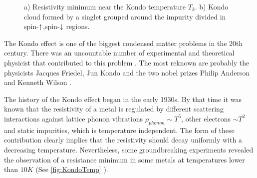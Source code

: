 \begin{figure}[t]
     \centering
    
     \caption{ a) Resistivity minimum near the Kondo temperature $T_k$. b) Kondo cloud formed by a singlet grouped around the impurity divided in spin-$\uparrow$,spin-$\downarrow$ regions.   \protect{}}
\end{figure}


The Kondo effect is one of the biggest condensed matter problems in the 20th century. There was an uncountable number of experimental and theoretical physicist that contributed to this problem . The most reknown are probably the physicists Jacques Friedel, Jun Kondo and the two nobel prizes Philip Anderson and Kenneth Wilson \citep{hewson_kondo_1997}. 

The history of the Kondo effect began in the early 1930s. By that time it was known that the resistivity of a metal is regulated by different scattering interactions against lattice phonon vibrations $\rho_{phonon} \sim T^5$, other electrons $\sim T^2$ and static impurities, which is temperature independent. The form of these contribution clearly implies that the resistivity should decay uniformly with a decreasing temperature. Nevertheless, some groundbreaking experiments revealed the observation of a resistance minimum in some metals at temperatures lower than $10K$ \cite{Kondo_deBoer1934} (See \ref{fig:KondoTemp} ). 


